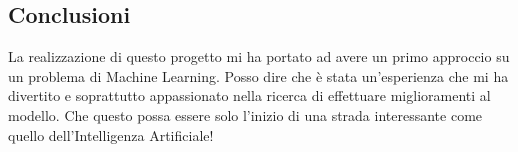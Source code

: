 \documentclass{article}
\begin{document}
\begin{titlepage}
        \section{Conclusioni}
        La realizzazione di questo progetto mi ha portato ad avere un primo approccio su un problema di Machine Learning. Posso dire che è stata un'esperienza che mi ha divertito e soprattutto appassionato nella ricerca di effettuare miglioramenti al modello. Che questo possa essere solo l'inizio di una strada interessante come quello dell'Intelligenza Artificiale!
        
\end{titlepage}
\end{document}
